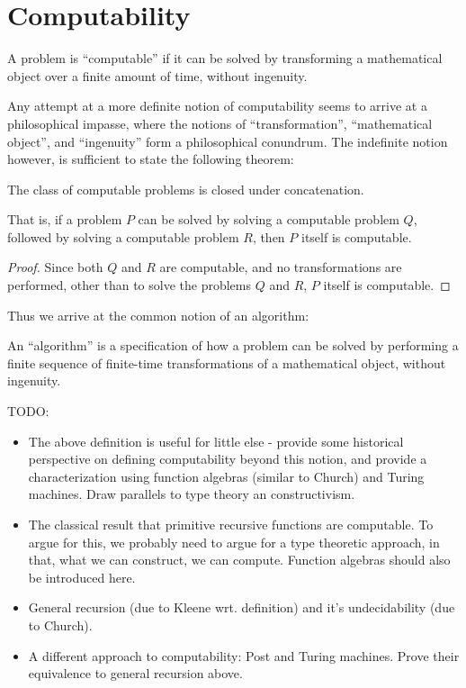 
\chapter{Computability}

\begin{notion} A problem is ``computable'' if it can be solved by transforming
a mathematical object over a finite amount of time, without ingenuity.
\end{notion}

Any attempt at a more definite notion of computability seems to arrive at a
philosophical impasse, where the notions of ``transformation'', ``mathematical
object'', and ``ingenuity'' form a philosophical conundrum. The indefinite
notion however, is sufficient to state the following theorem:

\begin{theorem} The class of computable problems is closed under
concatenation.\end{theorem}

That is, if a problem $P$ can be solved by solving a computable problem $Q$,
followed by solving a computable problem $R$, then $P$ itself is computable.

\begin{proof} Since both $Q$ and $R$ are computable, and no transformations are
performed, other than to solve the problems $Q$ and $R$, $P$ itself is
computable.\end{proof}

Thus we arrive at the common notion of an algorithm:

\begin{notion} An ``algorithm'' is a specification of how a problem can be
solved by performing a finite sequence of finite-time transformations of a
mathematical object, without ingenuity. \end{notion}

TODO:

\begin{itemize}

\item The above definition is useful for little else - provide some historical
perspective on defining computability beyond this notion, and provide a
characterization using function algebras (similar to Church) and Turing
machines. Draw parallels to type theory an constructivism.

\item The classical result that primitive recursive functions are computable.
To argue for this, we probably need to argue for a type theoretic approach, in
that, what we can construct, we can compute. Function algebras should also be
introduced here.

\item General recursion (due to Kleene wrt. definition) and it's undecidability
(due to Church).

\item A different approach to computability: Post and Turing machines. Prove
their equivalence to general recursion above.

\end{itemize}

